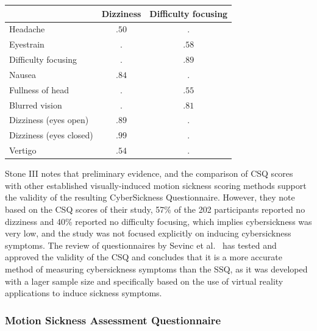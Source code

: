 \begin{center}
    \begin{tabular}{ l c c}
        \toprule
        \textbf{} & \textbf{Dizziness} & \textbf{Difficulty focusing} \\
        \midrule
        Headache                & $.50$ & $.$   \\
        Eyestrain               & $.$   & $.58$ \\
        Difficulty focusing     & $.$   & $.89$ \\
        Nausea                  & $.84$ & $.$   \\
        Fullness of head        & $.$   & $.55$ \\
        Blurred vision          & $.$   & $.81$ \\
        Dizziness (eyes open)   & $.89$ & $.$   \\
        Dizziness (eyes closed) & $.99$ & $.$   \\
        Vertigo                 & $.54$ & $.$   \\
        \bottomrule
    \end{tabular}
    \label{tab:csq-scoring}
\end{center}
Stone III notes that preliminary evidence, and the comparison of CSQ scores with other established visually-induced
motion sickness scoring methods support the validity of the resulting CyberSickness Questionnaire.
However, they note based on the CSQ scores of their study, 57\% of the 202 participants reported no dizziness and 40\%
reported no difficulty focusing, which implies cybersickness was very low, and the study was not focused
explicitly on inducing cybersickness symptoms.
The review of questionnaires by Sevinc et al.~\cite{Sevinc2020} has tested and approved the validity of the CSQ and
concludes that it is a more accurate method of measuring cybersickness symptoms than the SSQ, as it was developed
with a lager sample size and specifically based on the use of virtual reality applications to induce sickness symptoms.

\subsubsection{Motion Sickness Assessment Questionnaire}\label{subsubsec:motion-sickness-assessment-questionnaire}

